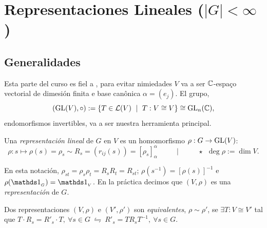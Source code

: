 \setcounter{section}{0}
\section{Representaciones Lineales ($|G|< \infty$)}

\subsection*{Generalidades}

\renewcommand{\hom}{\mathcal{L}}
Esta parte del curso es fiel a \cite{rep}, para evitar nimiedades \(V\) va a ser \(\mathbb{C}\)-espaço vectorial de dimesión finita e base canônica \(\alpha = (e_j)\). El grupo, 
\[(\GL(V),\circ) := \{T \in \hom (V) \ \mid  \ T: V \cong V\}\cong \operatorname{GL}_n(\C),\] 
endomorfismos invertibles, va a ser nuestra herramienta principal.

\begin{definition}
    Una \emph{representación lineal} de \(G\) en \(V\) es un homomorfismo \(\rho: G \to \operatorname{GL}(V)\): 
    \[\rho : s \mapsto \rho(s) = \rho_s\sim R_s= (r_{ij}(s))  = [\rho_s]_\alpha^\alpha \hspace{1cm} \mid \hspace{1cm} \star \ \ \deg \rho := \dim V.\]
\end{definition}

\begin{note}
    En esta notación, \(\rho_{st} = \rho_s \rho_t = R_sR_t = R_{st}\);  \(\rho(s^{-1}) = [\rho(s)]^{-1}\) e \(\rho(\id_{_G}) = \id_{_V}\).  En la práctica decimos que \((V, \rho)\) es una \emph{representación} de \(G\).
\end{note}

\begin{definition}
    Dos representaciones \((V,\rho)\) e \((V',\rho')\) son \emph{equivalentes}, \(\rho \sim \rho'\), se \(\exists T:V \cong V'\) tal que \(T \cdot R_s = R'_s \cdot T, \ \forall s \in G \ \leftrightharpoons \ R'_s = T R_s T^{-1},\ \forall s \in G\). 
\end{definition}

\newcommand{\D}{\mathbb{D}}

